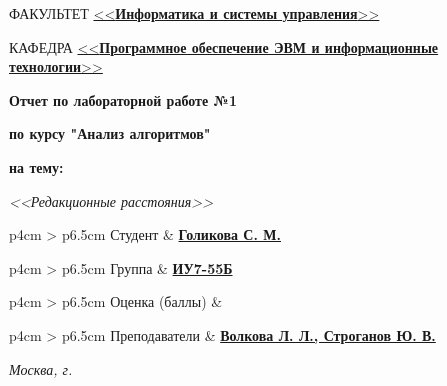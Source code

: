 \begin{titlepage}
	\begin{flushleft}
		\fontsize{12pt}{0.8\baselineskip}\selectfont 
		
		ФАКУЛЬТЕТ \uline{<<\textbf{Информатика и системы управления}>> \hfill}
		
		КАФЕДРА \uline{\mbox{\hspace{4mm}} <<\textbf{Программное обеспечение ЭВМ и информационные технологии}>> \hfill}
	\end{flushleft}

	\vfill

	\begin{center}
		\fontsize{20pt}{\baselineskip}\selectfont

		\textbf{Отчет по лабораторной работе №1}

		\textbf{по курсу "Анализ алгоритмов"}

		\textbf{на тему:}
	\end{center}

	\begin{center}
		\fontsize{18pt}{0.6cm}\selectfont 
		
			\textit{<<Редакционные расстояния>>}
		
	\end{center}

	\vfill

	\begin{table}[h!]
		\fontsize{12pt}{0.7\baselineskip}\selectfont
		
		\begin{signstabular}[0.55]{p{4cm} > {\centering\arraybackslash}p{6.5cm}}
				Студент & \uline{\textbf{Голикова С. М.} \hfill} 
		\end{signstabular}
		
		\begin{signstabular}[0.55]{p{4cm} > {\centering\arraybackslash}p{6.5cm}}
				Группа & \uline{\textbf{ИУ7-55Б} \hfill} 
		\end{signstabular}
		
		\begin{signstabular}[0.55]{p{4cm} > {\centering\arraybackslash}p{6.5cm}}
				Оценка (баллы) & \uline{\mbox{\hspace*{6.5cm}}} 
		\end{signstabular}
		
		\begin{signstabular}[0.55]{p{4cm} > {\centering\arraybackslash}p{6.5cm}}
				Преподаватели & \uline{\textbf{Волкова Л. Л., Строганов Ю. В.} \hfill}
		\end{signstabular}
	\end{table}
	
	\vfill

	\begin{center}
		\normalsize \textit{Москва, \the\year г.}
	\end{center}
\end{titlepage}